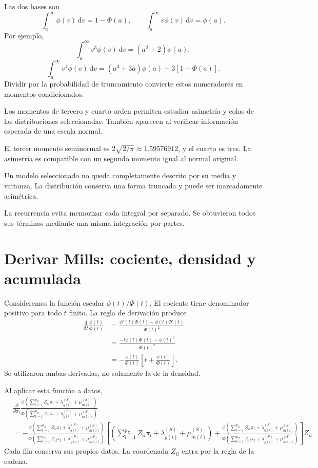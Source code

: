 \documentclass[11pt,a4paper]{article}
\newcommand{\dd}{\,\mathrm d}
\begin{document}
Las dos bases son
\[
\int_a^\infty\phi(v)\dd v=1-\Phi(a),
\qquad
\int_a^\infty v\phi(v)\dd v=\phi(a).
\]
Por ejemplo,
\[
\int_a^\infty v^3\phi(v)\dd v
=(a^2+2)\phi(a),
\]
\[
\int_a^\infty v^4\phi(v)\dd v
=(a^3+3a)\phi(a)+3[1-\Phi(a)].
\]
Dividir por la probabilidad de truncamiento
convierte estos numeradores en
momentos condicionados.

Los momentos de tercero y cuarto orden
permiten estudiar asimetría y colas
de las distribuciones seleccionadas.
También aparecen al verificar
información esperada de una escala normal.

\begin{ejemplo}
El tercer momento seminormal es
\(2\sqrt{2/\pi}\approx1.59576912\),
y el cuarto es tres.
La asimetría es compatible con
un segundo momento igual al normal original.
\end{ejemplo}
Un modelo seleccionado no queda
completamente descrito por su media
y varianza. La distribución conserva
una forma truncada y puede ser
marcadamente asimétrica.

La recurrencia evita memorizar
cada integral por separado.
Se obtuvieron todos sus términos
mediante una misma integración por partes.


\clearpage
\section{Derivar Mills: cociente, densidad y acumulada}

Consideremos la función escalar
\(\phi(t)/\Phi(t)\).
El cociente tiene denominador positivo
para todo \(t\) finito.
La regla de derivación produce
\[
\begin{aligned}
\frac{\dd}{\dd t}\frac{\phi(t)}{\Phi(t)}
&=\frac{\phi'(t)\Phi(t)-\phi(t)\Phi'(t)}{\Phi(t)^2}\\
&=\frac{-t\phi(t)\Phi(t)-\phi(t)^2}{\Phi(t)^2}\\
&=-\frac{\phi(t)}{\Phi(t)}
\left[t+\frac{\phi(t)}{\Phi(t)}\right].
\end{aligned}
\]
Se utilizaron ambas derivadas,
no solamente la de la densidad.

Al aplicar esta función a datos,
\[
\begin{aligned}
&\frac{\partial}{\partial\pi_l}
\frac{\phi(\sum_{l=1}^{p_Z}Z_{il}\pi_l+\lambda_{y(i)}^{(S)}+\mu_{m(i)}^{(S)})}
{\Phi(\sum_{l=1}^{p_Z}Z_{il}\pi_l+\lambda_{y(i)}^{(S)}+\mu_{m(i)}^{(S)})}\\
&=-\frac{\phi(\sum_{l=1}^{p_Z}Z_{il}\pi_l+\lambda_{y(i)}^{(S)}+\mu_{m(i)}^{(S)})}
{\Phi(\sum_{l=1}^{p_Z}Z_{il}\pi_l+\lambda_{y(i)}^{(S)}+\mu_{m(i)}^{(S)})}
\left[
\left(\sum_{l=1}^{p_Z}Z_{il}\pi_l+\lambda_{y(i)}^{(S)}+\mu_{m(i)}^{(S)}\right)+
\frac{\phi(\sum_{l=1}^{p_Z}Z_{il}\pi_l+\lambda_{y(i)}^{(S)}+\mu_{m(i)}^{(S)})}
{\Phi(\sum_{l=1}^{p_Z}Z_{il}\pi_l+\lambda_{y(i)}^{(S)}+\mu_{m(i)}^{(S)})}
\right]Z_{il}.
\end{aligned}
\]
Cada fila conserva sus propios datos.
La coordenada \(Z_{il}\) entra
por la regla de la cadena.
\end{document}
